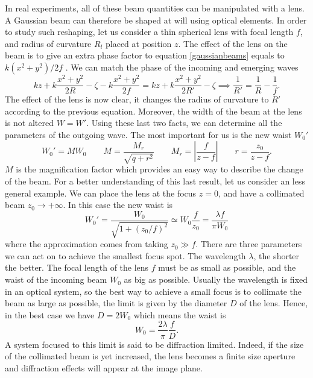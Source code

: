 In real experiments, all of these beam quantities can be manipulated with a lens. A Gaussian beam can therefore be shaped at will using optical elements. In order to study such reshaping, let us consider a thin spherical lens with focal length $f$, and radius of curvature $R_l$ placed at position $z$. The effect of the lens on the beam is to give an extra phase factor to equation \eqref{gaussianbeams} equals to $k(x^2 + y^2)/2f$ \cite{beamparameters}. We can match the phase of the incoming and emerging waves
\begin{equation}
kz +k \frac{x^2+y^2}{2R} - \zeta  - k\frac{x^2 + y^2}{2f} = kz + k \frac{x^2+y^2}{2R'} - \zeta \implies \frac{1}{R'} = \frac{1}{R} - \frac{1}{f}.
\end{equation}
The effect of the lens is now clear, it changes the radius of curvature to $R'$ according to the previous equation. Moreover, the width of the beam at the lens is not altered $W=W'$. Using these last two facts, we can determine all the parameters of the outgoing wave. The most important for us is the new waist $W_0'$
\begin{equation}
W_0' = MW_0 \qquad M = \frac{M_r}{\sqrt{q+r^2}} \qquad M_r = \left|\frac{f}{z-f}\right| \qquad r = \frac{z_0}{z-f}.
\end{equation}
$M$ is the magnification factor which provides an easy way to describe the change of the beam. For a better understanding of this last result, let us consider an less general example. We can place the lens at the focus $z=0$, and have a collimated beam $z_0 \to +\infty $. In this case the new waist is
\begin{equation}
W_0' = \frac{W_0}{\sqrt{1 + (z_0/f)^2}} \simeq W_0\frac{f}{z_0} = \frac{\lambda f}{\pi W_0}
\end{equation}
where the approximation comes from taking $z_0\gg f$. There are three parameters we can act on to achieve the smallest focus spot. The wavelength $\lambda$, the shorter the better. The focal length of the lens $f$ must be as small as possible, and the waist of the incoming beam $W_0$ as big as possible. Usually the wavelength is fixed in an optical system, so the best way to achieve a small focus is to collimate the beam as large as possible, the limit is given by the diameter $D$ of the lens. Hence, in the best case we have $D = 2W_0$ which means the waist is
\begin{equation}
W_0 = \frac{2\lambda}{\pi} \frac{f}{D}.
\end{equation}
A system focused to this limit is said to be diffraction limited. Indeed, if the size of the collimated beam is yet increased, the lens becomes a finite size aperture and diffraction effects will appear at the image plane.%

